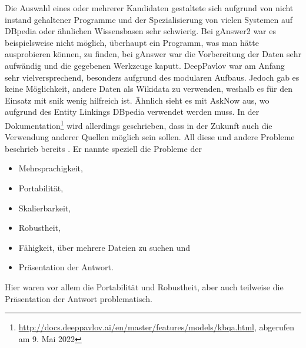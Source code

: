 Die Auswahl eines oder mehrerer Kandidaten gestaltete sich aufgrund von nicht instand gehaltener Programme
und der Spezialisierung von vielen Systemen auf DBpedia oder ähnlichen Wissensbasen sehr schwierig.
Bei gAnswer2 war es beispielsweise nicht möglich, überhaupt ein Programm, was man hätte ausprobieren können, zu finden,
bei gAnswer war die Vorbereitung der Daten sehr aufwändig und die gegebenen Werkzeuge kaputt.
DeepPavlov war am Anfang sehr vielversprechend, besonders aufgrund des modularen Aufbaus.
Jedoch gab es keine Möglichkeit, andere Daten als Wikidata zu verwenden, weshalb es für den Einsatz mit \ac{snik} wenig hilfreich ist.
Ähnlich sieht es mit AskNow aus, wo aufgrund des Entity Linkings DBpedia verwendet werden muss.
In der Dokumentation\footnote{\url{http://docs.deeppavlov.ai/en/master/features/models/kbqa.html}, abgerufen am 9. Mai 2022} wird allerdings geschrieben,
dass in der Zukunft auch die Verwendung anderer Quellen möglich sein sollen.
All diese und andere Probleme beschrieb bereits \citet{diefenbachkbqa}.
Er nannte speziell die Probleme der
\begin{itemize}
  \item Mehrsprachigkeit,
  \item Portabilität,
  \item Skalierbarkeit,
  \item Robustheit,
  \item Fähigkeit, über mehrere Dateien zu suchen und
  \item Präsentation der Antwort.
\end{itemize}
Hier waren vor allem die Portabilität und Robustheit, aber auch teilweise die Präsentation der Antwort problematisch.

